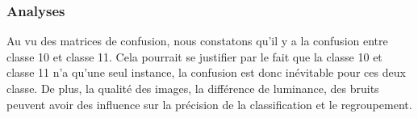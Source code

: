 \documentclass[french,12pt,a4paper,oneside,notitlepage]{report}
\begin{document}
\begin{table}[!ht]
    \begin{center}
    \end{center}
    \caption{Matrice de confusion PCA, Kmeans avec k = 11}
\end{table}
\clearpage
\subsubsection{ Analyses}
Au vu des matrices de confusion, nous constatons qu'il y a la confusion entre classe 10 et classe 11. Cela pourrait se justifier par le fait que la classe 10 et classe 11 n'a qu'une seul instance, la confusion est donc inévitable pour ces deux classe. 
De plus, la qualité des images, la différence de luminance, des bruits peuvent avoir des influence sur la précision de la classification et le regroupement. 
\end{document}

